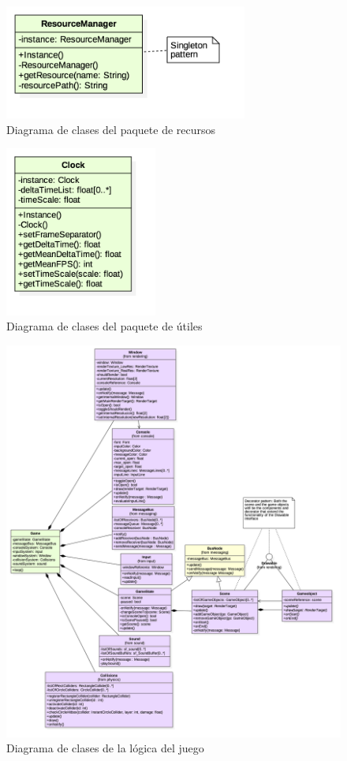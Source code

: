 \begin{figure}
	\centerline{\includegraphics[width=8cm]{otros/UML/png/alld/png/resources__diagramaDeClases_resources_0.png}}
	\caption{Diagrama de clases del paquete de recursos}
	\label{class:resources}
\end{figure}

\begin{figure}
	\centerline{\includegraphics[width=5cm]{otros/UML/png/alld/png/utils__diagramaDeClases_utils_10.png}}
	\caption{Diagrama de clases del paquete de útiles}
	\label{class:utils}
\end{figure}

\begin{figure}
	\centerline{\includegraphics[width=18cm]{otros/UML/png/alld/png/gamelogic__diagramaDeClases_gamelogic_7.png}}
	\caption{Diagrama de clases de la lógica del juego}
	\label{class:gamelogic}
\end{figure}

